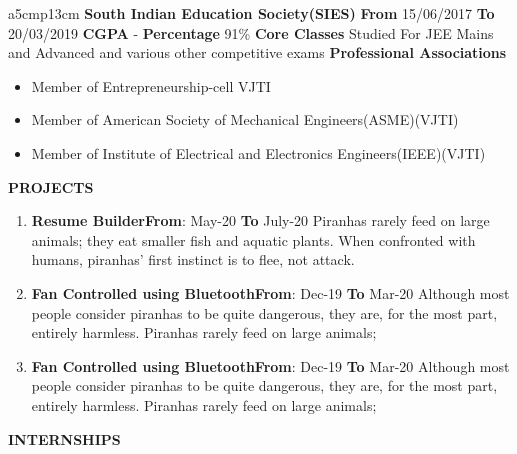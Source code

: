 \documentclass{article}
\begin{document}
{\begin{longtable}{ a{5cm}p{13cm} }
\textbf{South Indian Education Society(SIES)} \newline \textbf{From} 15/06/2017 \textbf{To} 20/03/2019 \hspace{1cm}  \textbf{CGPA} -  \hspace{1cm}  \textbf{Percentage} 91\% \newline \textbf{Core Classes}
Studied For JEE Mains and Advanced and various other competitive exams \newline
\textbf{Professional Associations} 
\begin{itemize}[noitemsep,nolistsep]
	\item Member of Entrepreneurship-cell VJTI
    \item Member of American Society of Mechanical Engineers(ASME)(VJTI)
    \item Member of Institute of Electrical and Electronics Engineers(IEEE)(VJTI)\newline
\end{itemize} 


{\large{\textbf{\uppercase{Projects}}}}\newline

\begin{enumerate}
	\item {\textbf{Resume Builder}}\hfill {\textbf{From}}: May-20 {\textbf{To}} July-20\newline
	Piranhas rarely feed on large animals; they eat smaller fish and aquatic plants. When confronted with humans, piranhas' first instinct is to flee, not attack. 
	\item {\textbf{Fan Controlled using Bluetooth}}\hfill {\textbf{From}}: Dec-19 {\textbf{To}} Mar-20\newline
	Although most people consider piranhas to be quite dangerous, they are, for the most part, entirely harmless. Piranhas rarely feed on large animals;
	\item {\textbf{Fan Controlled using Bluetooth}}\hfill {\textbf{From}}: Dec-19 {\textbf{To}} Mar-20\newline
	Although most people consider piranhas to be quite dangerous, they are, for the most part, entirely harmless. Piranhas rarely feed on large animals; \newline
\end{enumerate}


{\large{\textbf{\uppercase{Internships}}}}\newline


\end{longtable}}
\end{document}
